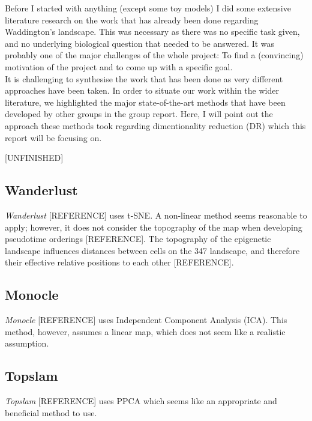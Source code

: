 \documentclass[journal, a4paper]{IEEEtran}
\begin{document}
Before I started with anything (except some toy models) I did some extensive literature research on the work that has already been done regarding Waddington's landscape. This was necessary as there was no specific task given, and no underlying biological question that needed to be answered. It was probably one of the major challenges of the whole project: To find a (convincing) motivation of the project and to come up with a specific goal.\\
It is challenging to synthesise the work that has been done as very different approaches have been taken. In order to situate our work within the wider literature, we highlighted the major state-of-the-art methods that have been developed by other groups in the group report.
Here, I will point out the approach these methods took regarding dimentionality reduction (DR) which this report will be focusing on. 

[UNFINISHED]

\subsection{Wanderlust}
\textit{Wanderlust} [REFERENCE] uses t-SNE. A non-linear method seems reasonable to apply; however, it does not consider the topography of the map when developing pseudotime orderings [REFERENCE]. The topography of the epigenetic landscape influences distances between cells on the 347 landscape, and therefore their effective relative positions to each other [REFERENCE]. 

\subsection{Monocle}
\textit{Monocle} [REFERENCE] uses Independent Component Analysis (ICA). This method, however, assumes a linear map, which does not seem like a realistic assumption.

\subsection{Topslam}
\textit{Topslam} [REFERENCE] uses PPCA which seems like an appropriate and beneficial method to use.
\end{document}
